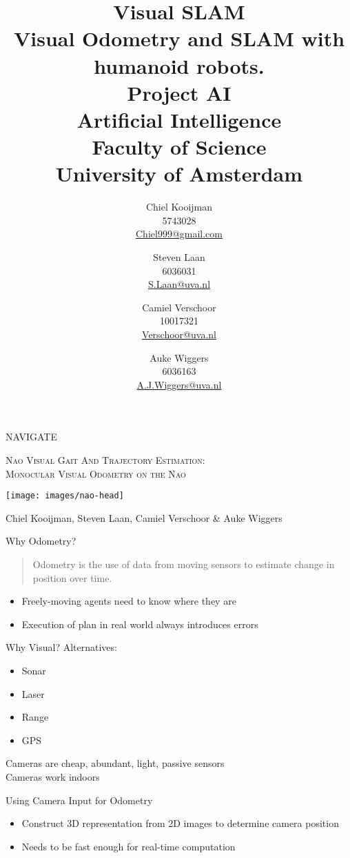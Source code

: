\documentclass{beamer}
\author{Chiel Kooijman\\5743028\\\url{Chiel999@gmail.com} \and
Steven Laan\\6036031\\\url{S.Laan@uva.nl} \and
Camiel Verschoor\\10017321\\\url{Verschoor@uva.nl} \and
Auke Wiggers\\6036163\\\url{A.J.Wiggers@uva.nl}}
\title{Visual SLAM\\ \normalsize Visual Odometry and SLAM with humanoid
robots.\\Project AI\\Artificial Intelligence\\Faculty of Science\\ University
of Amsterdam}
\begin{document}
\begin{frame}
	\begin{center}
		{\LARGE NAVIGATE}
	\end{center}

	\begin{center}
		\textsc{Nao Visual Gait And Trajectory Estimation:}\\
		\textsc{\small Monocular Visual Odometry on the Nao}
	\end{center}

	\begin{center}
		\texttt{[image: images/nao-head]}
	\end{center}
	Chiel Kooijman, Steven Laan, Camiel Verschoor \& Auke Wiggers
\end{frame}

\begin{frame}{Why Odometry?}
	\begin{quote}
		Odometry is the use of data from moving sensors to estimate change in
		position over time.
	\end{quote}

	\begin{itemize}
		\item Freely-moving agents need to know where they are
		\item Execution of plan in real world always introduces errors
	\end{itemize}
\end{frame}

\begin{frame}{Why Visual?}
	Alternatives:
	\begin{itemize}
		\item Sonar
		\item Laser
		\item Range
		\item GPS
	\end{itemize}

	Cameras are cheap, abundant, light, passive sensors\\
	Cameras work indoors
\end{frame}

\begin{frame}{Using Camera Input for Odometry}
	\begin{itemize}
		\item Construct 3D representation from 2D images to determine camera
			position
		\item Needs to be fast enough for real-time computation
	\end{itemize}
\end{frame}
\end{document}
